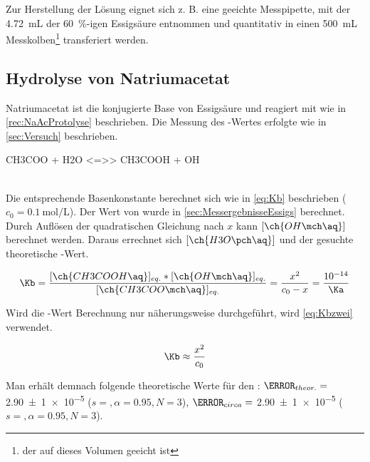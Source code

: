 \documentclass{article}
\begin{document}
         Zur Herstellung der Lösung eignet sich z. B. eine geeichte Messpipette, mit der \SI[mode=text]{4.72}{\milli\liter} der \SI[mode=text]{60}{\percent}-igen Essigsäure entnommen und quantitativ in einen \SI[mode=text]{500}{\milli\liter} Messkolben\footnote{der auf dieses Volumen geeicht ist} transferiert werden.
     
    \subsection{Hydrolyse von Natriumacetat} \label{sec:HydrolyseNatrium}
     
       Natriumacetat ist die konjugierte Base von Essigsäure und reagiert mit  wie in \ref{rec:NaAcProtolyse} beschrieben. Die Messung des \pH-Wertes erfolgte wie in \ref{sec:Versuch} beschrieben.
       
       \begin{reaction}
         CH3COO\mch\aq{} + H2O <=>> CH3COOH\aq{} + OH\mch\aq \label{rec:NaAcProtolyse} \\
       \end{reaction} \\
       
       Die entsprechende Basenkonstante \Kb berechnet sich wie in \ref{eq:Kb} beschrieben ($c_{0} = \SI[mode=text]{0.1}{\mole\per\liter}$). Der Wert von \Ka wurde in \ref{sec:MessergebnisseEssigs} berechnet. Durch Auflösen der quadratischen Gleichung nach $x$ kann $[\ch{OH\mch\aq}]$ berechnet werden. Daraus errechnet sich $[\ch{H3O\pch\aq}]$ und der gesuchte theoretische \pH-Wert. 
       
       \begin{equation}
         \Kb = \frac{[\ch{CH3COOH\aq}]_{eq.} * [\ch{OH\mch\aq}]_{eq.}}{[\ch{CH3COO\mch\aq}]_{eq.}} = \frac{x^2}{c_{0}-x} = \frac{\num{e-14}}{\Ka} \label{eq:Kb}
       \end{equation}
       
       Wird die \pH-Wert Berechnung nur näherungsweise durchgeführt, wird \ref{eq:Kbzwei} verwendet.
       
       \begin{equation}
         \Kb \approx \frac{x^2}{c_{0}} \label{eq:Kbzwei}
       \end{equation}
       
       Man erhält demnach folgende theoretische Werte für den \pH: $\pH_{theor.} = $ \num[separate-uncertainty]{2.90 \pm 1 e-5} ($s = ,\alpha = 0.95, N = 3$), $\pH_{circa} = $ \num[separate-uncertainty]{2.90 \pm 1 e-5} ($s = ,\alpha = 0.95, N = 3$). \\
       
\end{document}
